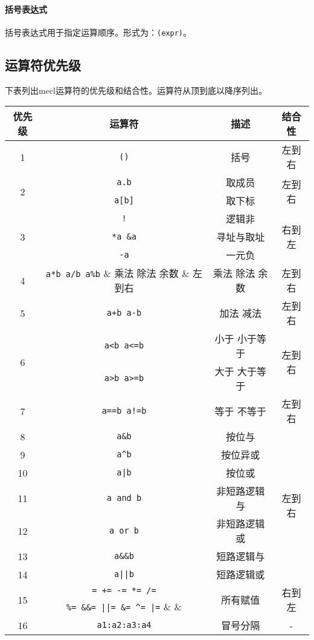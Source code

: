 \documentclass[UTF8]{ctexart}
\begin{document}
\paragraph{括号表达式} 括号表达式用于指定运算顺序。形式为：\verb|(expr)|。

\subsection{运算符优先级}

下表列出mecl运算符的优先级和结合性。运算符从顶到底以降序列出。

\begin{table}[H]
	\centering
	\begin{tabular}{|c|c|c|c|}
		\hline
		优先级 & 运算符 & 描述 & 结合性 \\\hline
		1 & \verb|()| & 括号 & 左到右 \\\hline
		\multirow{2}{*}{2} & \verb|a.b| & 取成员 & \multirow{2}{*}{左到右} \\\cline{2-3}
		& \verb|a[b]| & 取下标 & \\\hline
		\multirow{3}{*}{3} & \verb|!| & 逻辑非 & \multirow{3}{*}{右到左}\\\cline{2-3}
		& \verb|*a &a| & 寻址与取址 & \\\cline{2-3}
		& \verb|-a| & 一元负 & \\\hline
		4 & \verb|a*b a/b a%b| & 乘法 除法 余数 & 左到右 \\\hline
		5 & \verb|a+b a-b| & 加法 减法 & 左到右 \\\hline
		\multirow{2}{*}{6} & \verb|a<b a<=b| & 小于 小于等于 & \multirow{2}{*}{左到右} \\\cline{2-3}
		& \verb|a>b a>=b| & 大于 大于等于 & \\\hline
		7 & \verb|a==b a!=b| & 等于 不等于 & 左到右 \\\hline
		8 & \verb|a&b| & 按位与 & \multirow{7}{*}{左到右} \\\cline{1-3}
		9 & \verb|a^b| & 按位异或 & \\\cline{1-3}
		10 & \verb&a|b& & 按位或 & \\\cline{1-3}
		11 & \verb|a and b| & 非短路逻辑与 & \\\cline{1-3}
		12 & \verb|a or b| & 非短路逻辑或 & \\\cline{1-3}
		13 & \verb|a&&b| & 短路逻辑与 & \\\cline{1-3}
		14 & \verb&a||b& & 短路逻辑或 & \\\hline
		\multirow{2}{*}{15} & \verb|= += -= *= /=| & \multirow{2}{*}{所有赋值} & \multirow{2}{*}{右到左} \\\cline{2-2}
		& \verb"%= &&= ||= &= ^= |=" &  & \\\hline
		16 & \verb|a1:a2:a3:a4| & 冒号分隔 & - \\\hline
	\end{tabular}
\end{table}
\end{document}
